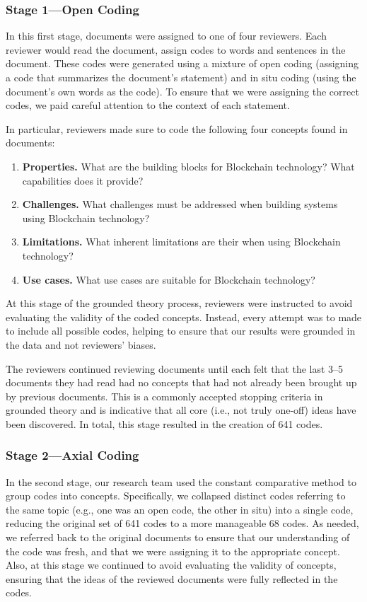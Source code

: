 \subsubsection{Stage 1---Open Coding}
In this first stage, documents were assigned to one of four reviewers.
Each reviewer would read the document, assign codes to words and sentences in the document.
These codes were generated using a mixture of open coding (assigning a code that summarizes the document's statement) and in situ coding (using the document's own words as the code).
To ensure that we were assigning the correct codes, we paid careful attention to the context of each statement.

In particular, reviewers made sure to code the following four concepts found in documents:
\begin{enumerate}
	\item \textbf{Properties.} What are the building blocks for Blockchain technology? What capabilities does it provide?
	\item \textbf{Challenges.} What challenges must be addressed when building systems using Blockchain technology?
	\item \textbf{Limitations.} What inherent limitations are their when using Blockchain technology?
	\item \textbf{Use cases.} What use cases are suitable for Blockchain technology?
\end{enumerate}

At this stage of the grounded theory process, reviewers were instructed to avoid evaluating the validity of the coded concepts.
Instead, every attempt was to made to include all possible codes, helping to ensure that our results were grounded in the data and not reviewers' biases.

The reviewers continued reviewing documents until each felt that the last 3--5 documents they had read had no concepts that had not already been brought up by previous documents.
This is a commonly accepted stopping criteria in grounded theory and is indicative that all core (i.e., not truly one-off) ideas have been discovered.
In total, this stage resulted in the creation of 641 codes.

\subsubsection{Stage 2---Axial Coding}
In the second stage, our research team used the constant comparative method to group codes into concepts.
Specifically, we collapsed distinct codes referring to the same topic (e.g., one was an open code, the other in situ) into a single code, reducing the original set of 641 codes to a more manageable 68 codes.
As needed, we referred back to the original documents to ensure that our understanding of the code was fresh, and that we were assigning it to the appropriate concept.
Also, at this stage we continued to avoid evaluating the validity of concepts, ensuring that the ideas of the reviewed documents were fully reflected in the codes.

